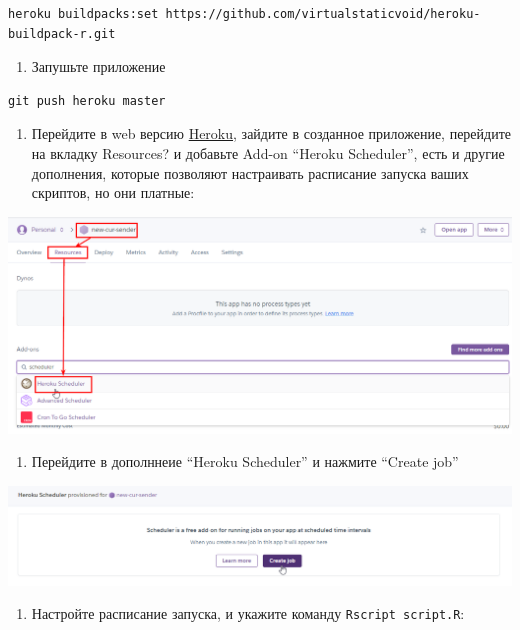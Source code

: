 \documentclass[
]{book}
\providecommand{\tightlist}{%
  \setlength{\itemsep}{0pt}\setlength{\parskip}{0pt}}
\begin{document}
\begin{verbatim}
heroku buildpacks:set https://github.com/virtualstaticvoid/heroku-buildpack-r.git
\end{verbatim}

\begin{enumerate}
\def\labelenumi{\arabic{enumi}.}
\setcounter{enumi}{5}
\tightlist
\item
  Запушьте приложение
\end{enumerate}

\begin{verbatim}
git push heroku master
\end{verbatim}

\begin{enumerate}
\def\labelenumi{\arabic{enumi}.}
\setcounter{enumi}{6}
\tightlist
\item
  Перейдите в web версию \href{https://heroku.com}{Heroku}, зайдите в созданное приложение, перейдите на вкладку Resources? и добавьте Add-on ``Heroku Scheduler'', есть и другие дополнения, которые позволяют настраивать расписание запуска ваших скриптов, но они платные:
\end{enumerate}

\includegraphics{img/9-10.png}

\begin{enumerate}
\def\labelenumi{\arabic{enumi}.}
\setcounter{enumi}{7}
\tightlist
\item
  Перейдите в дополннеие ``Heroku Scheduler'' и нажмите ``Create job''
\end{enumerate}

\includegraphics{img/9-11.png}

\begin{enumerate}
\def\labelenumi{\arabic{enumi}.}
\setcounter{enumi}{8}
\tightlist
\item
  Настройте расписание запуска, и укажите команду \texttt{Rscript\ script.R}:
\end{enumerate}
\end{document}
